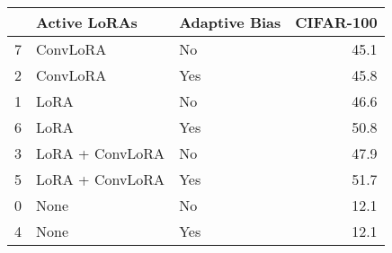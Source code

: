 \begin{tabular}{lllr}
\toprule
 & Active LoRAs & Adaptive Bias & CIFAR-100 \\
\midrule
7 & ConvLoRA & No & 45.1 \\
2 & ConvLoRA & Yes & 45.8 \\
1 & LoRA & No & 46.6 \\
6 & LoRA & Yes & 50.8 \\
3 & LoRA + ConvLoRA & No & 47.9 \\
5 & LoRA + ConvLoRA & Yes & 51.7 \\
0 & None & No & 12.1 \\
4 & None & Yes & 12.1 \\
\bottomrule
\end{tabular}
